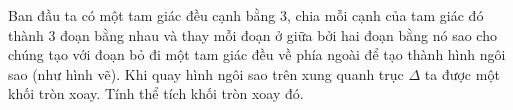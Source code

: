 
\begin{ex}%
\immini 
{ Ban đầu ta có một tam giác đều cạnh bằng $3$, chia mỗi cạnh của tam giác đó thành $3$ đoạn bằng nhau và thay mỗi đoạn ở giữa bởi hai đoạn bằng nó sao cho chúng tạo với đoạn bỏ đi một tam giác đều về phía ngoài để tạo thành hình ngôi sao (như hình vẽ). Khi quay hình ngôi sao trên xung quanh trục $\Delta$ ta được một khối tròn xoay. Tính thể tích khối tròn xoay đó.
}
{}
\end{ex}
